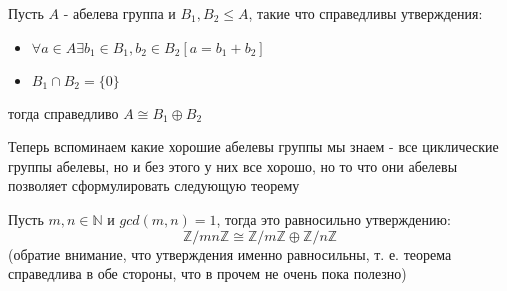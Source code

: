 \begin{Th}
Пусть $A$ - абелева группа и $B_1, B_2 \le A$, такие что справедливы утверждения:
\begin{itemize}
\item $\forall a \in A \exists b_1 \in B_1, b_2 \in B_2 \left[a = b_1 + b_2\right]$

\item $B_1 \cap B_2 = \{0\}$
\end{itemize}
тогда справедливо $A \cong B_1 \oplus B_2$
\end{Th}

Теперь вспоминаем какие хорошие абелевы группы мы знаем - все циклические группы абелевы, но и без этого у них все хорошо, но то что они абелевы позволяет сформулировать следующую теорему

\begin{Th}
Пусть $m,n \in \mathbb{N}$ и $gcd\left(m,n\right) = 1$, тогда это равносильно утверждению:
\[
	\mathbb{Z}/{mn \mathbb{Z}} \cong \mathbb{Z} / {m \mathbb{Z}} \oplus  \mathbb{Z}/{n \mathbb{Z}}
\]
(обратие внимание, что утверждения именно равносильны, т. е. теорема справедлива в обе стороны, что в прочем не очень пока полезно)
\end{Th}

